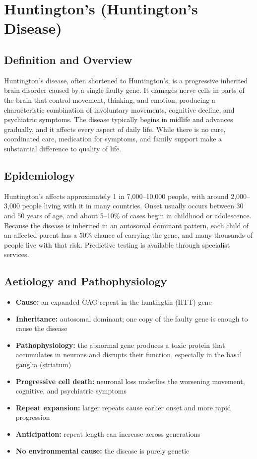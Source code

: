 \chapter{Huntington's (Huntington's Disease)}

\section*{Definition and Overview}
Huntington's disease, often shortened to Huntington's, is a progressive inherited brain disorder caused by a single faulty gene. It damages nerve cells in parts of the brain that control movement, thinking, and emotion, producing a characteristic combination of involuntary movements, cognitive decline, and psychiatric symptoms. The disease typically begins in midlife and advances gradually, and it affects every aspect of daily life. While there is no cure, coordinated care, medication for symptoms, and family support make a substantial difference to quality of life.

\section*{Epidemiology}
Huntington's affects approximately 1 in 7,000--10,000 people, with around 2,000--3,000 people living with it in many countries. Onset usually occurs between 30 and 50 years of age, and about 5--10\% of cases begin in childhood or adolescence. Because the disease is inherited in an autosomal dominant pattern, each child of an affected parent has a 50\% chance of carrying the gene, and many thousands of people live with that risk. Predictive testing is available through specialist services.

\section*{Aetiology and Pathophysiology}
\begin{itemize}
    \item \textbf{Cause:} an expanded CAG repeat in the huntingtin (HTT) gene
    \item \textbf{Inheritance:} autosomal dominant; one copy of the faulty gene is enough to cause the disease
    \item \textbf{Pathophysiology:} the abnormal gene produces a toxic protein that accumulates in neurons and disrupts their function, especially in the basal ganglia (striatum)
    \item \textbf{Progressive cell death:} neuronal loss underlies the worsening movement, cognitive, and psychiatric symptoms
    \item \textbf{Repeat expansion:} larger repeats cause earlier onset and more rapid progression
    \item \textbf{Anticipation:} repeat length can increase across generations
    \item \textbf{No environmental cause:} the disease is purely genetic
\end{itemize}

